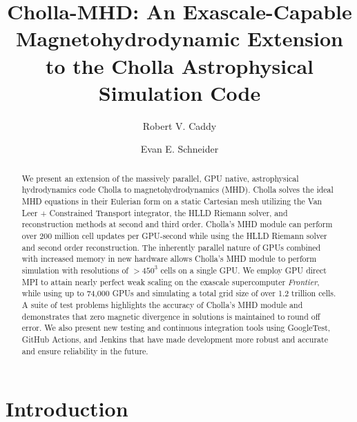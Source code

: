 \documentclass[modern, linenumbers]{aastex631}
\begin{document}
\title{Cholla-MHD: An Exascale-Capable Magnetohydrodynamic Extension to the Cholla Astrophysical Simulation Code}

\author[0000-0002-4475-3181]{Robert V. Caddy}

\author[0000-0001-9735-7484]{Evan E. Schneider}

\begin{abstract}

    We present an extension of the massively parallel, GPU native, astrophysical hydrodynamics code Cholla to magnetohydrodynamics (MHD).
    Cholla solves the ideal MHD equations in their Eulerian form on a static Cartesian mesh utilizing the Van Leer + Constrained Transport integrator, the HLLD Riemann solver, and reconstruction methods at second and third order.
    Cholla's MHD module can perform over 200 million cell updates per GPU-second while using the HLLD Riemann solver and second order reconstruction.
    The inherently parallel nature of GPUs combined with increased memory in new hardware allows Cholla's MHD module to perform simulation with resolutions of $>450^3$ cells on a single GPU.
    We employ GPU direct MPI to attain nearly perfect weak scaling on the exascale supercomputer \textit{Frontier}, while using up to 74,000 GPUs and simulating a total grid size of over 1.2 trillion cells.
    A suite of test problems highlights the accuracy of Cholla's MHD module and demonstrates that zero magnetic divergence in solutions is maintained to round off error.
    We also present new testing and continuous integration tools using GoogleTest, GitHub Actions, and Jenkins that have made development more robust and accurate and ensure reliability in the future.

    \end{abstract}


\section{Introduction}
\label{sec:intro}
\end{document}
